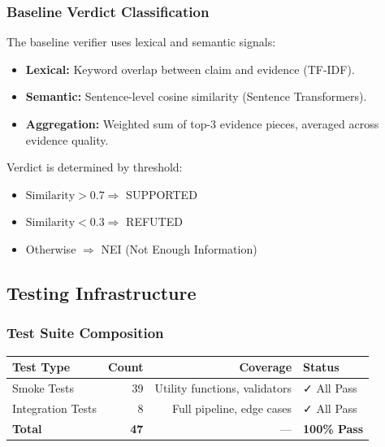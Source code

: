\documentclass[12pt,a4paper,twoside]{article}
\begin{document}
\subsubsection{Baseline Verdict Classification}

The baseline verifier uses lexical and semantic signals:

\begin{itemize}
    \item \textbf{Lexical:} Keyword overlap between claim and evidence (TF-IDF).
    \item \textbf{Semantic:} Sentence-level cosine similarity (Sentence Transformers).
    \item \textbf{Aggregation:} Weighted sum of top-3 evidence pieces, averaged across evidence quality.
\end{itemize}

Verdict is determined by threshold:
\begin{itemize}
    \item $\text{Similarity} > 0.7 \Rightarrow$ SUPPORTED
    \item $\text{Similarity} < 0.3 \Rightarrow$ REFUTED
    \item Otherwise $\Rightarrow$ NEI (Not Enough Information)
\end{itemize}

\subsection{Testing Infrastructure}

\subsubsection{Test Suite Composition}

\begin{table}[H]
    \centering
    \begin{tabular}{|l|r|r|l|}
        \hline
        \textbf{Test Type} & \textbf{Count} & \textbf{Coverage} & \textbf{Status} \\
        \hline
        Smoke Tests & 39 & Utility functions, validators & ✓ All Pass \\
        Integration Tests & 8 & Full pipeline, edge cases & ✓ All Pass \\
        \hline
        \textbf{Total} & \textbf{47} & --- & \textbf{100\% Pass} \\
        \hline
    \end{tabular}
\end{table}
\end{document}
